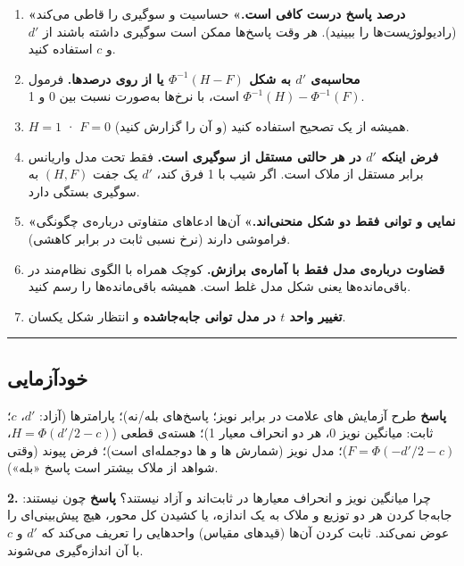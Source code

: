 \begin{enumerate}
\def\labelenumi{\arabic{enumi}.}
\tightlist
\item
  \textbf{«درصد پاسخ درست کافی است.»} حساسیت و سوگیری را قاطی می‌کند
  (رادیولوژیست‌ها را ببینید). هر وقت پاسخ‌ها ممکن است سوگیری داشته باشند
  از \(d'\) و \(c\) استفاده کنید.
\item
  \textbf{محاسبه‌ی \(d'\) به شکل \(\Phi^{-1}(H - F)\) یا از روی درصدها.}
  فرمول \(\Phi^{-1}(H) - \Phi^{-1}(F)\) است، با نرخ‌ها به‌صورت نسبت بین 0
  و 1.
\item
  \(H = 1\) · \(F = 0\) همیشه از یک تصحیح استفاده کنید (و آن را گزارش
  کنید).
\item
  \textbf{فرض اینکه \(d'\) در هر حالتی مستقل از سوگیری است.} فقط تحت مدل
  واریانس برابر مستقل از ملاک است. اگر شیب  با 1 فرق کند،
  \(d'\) یک جفت \((H, F)\) به سوگیری بستگی دارد.
\item
  \textbf{«نمایی و توانی فقط دو شکل منحنی‌اند.»} آن‌ها ادعاهای متفاوتی
  درباره‌ی چگونگی فراموشی دارند (نرخ نسبی ثابت در برابر کاهشی).
\item
  \textbf{قضاوت درباره‌ی مدل فقط با آماره‌ی برازش.}  کوچک همراه
  با الگوی نظام‌مند در باقی‌مانده‌ها یعنی شکل مدل غلط است. همیشه
  باقی‌مانده‌ها را رسم کنید.
\item
  \textbf{تغییر واحد \(t\) در مدل توانی جابه‌جاشده} و انتظار شکل یکسان.
\end{enumerate}

\begin{center}\rule{0.5\linewidth}{0.5pt}\end{center}

\subsection{خودآزمایی}

\textbf{پاسخ} طرح آزمایش های علامت در برابر نویز؛ پاسخ‌های
بله/نه)؛ پارامترها (آزاد: \(d'\)، \(c\)؛ ثابت: میانگین نویز 0، هر دو
انحراف معیار 1)؛ هسته‌ی قطعی (\(H = \Phi(d'/2 - c)\)،
\(F = \Phi(-d'/2 - c)\))؛ مدل نویز (شمارش ها و ها دوجمله‌ای است)؛ فرض پیوند (وقتی شواهد از ملاک بیشتر است پاسخ
«بله»).

\textbf{2.} چرا میانگین نویز و انحراف معیارها در  ثابت‌اند و آزاد
نیستند؟ \textbf{پاسخ} چون  نیستند: جابه‌جا کردن هر دو
توزیع و ملاک به یک اندازه، یا کشیدن کل محور، هیچ پیش‌بینی‌ای را عوض
نمی‌کند. ثابت کردن آن‌ها (قیدهای مقیاس) واحدهایی را تعریف می‌کند که \(d'\)
و \(c\) با آن اندازه‌گیری می‌شوند.

